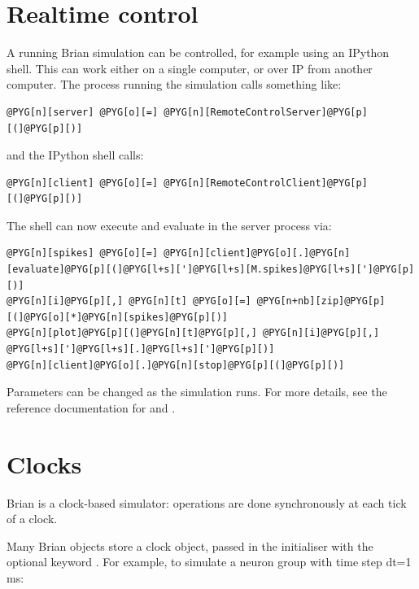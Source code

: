 \documentclass[letterpaper,10pt,english]{manual}
\begin{document}
\resetcurrentobjects
\hypertarget{--doc-realtime}{}

\section{Realtime control}

A running Brian simulation can be controlled, for example using an IPython shell.
This can work either on a single computer, or over IP from another computer.
The process running the simulation calls something like:

\begin{Verbatim}[commandchars=@\[\]]
@PYG[n][server] @PYG[o][=] @PYG[n][RemoteControlServer]@PYG[p][(]@PYG[p][)]
\end{Verbatim}

and the IPython shell calls:

\begin{Verbatim}[commandchars=@\[\]]
@PYG[n][client] @PYG[o][=] @PYG[n][RemoteControlClient]@PYG[p][(]@PYG[p][)]
\end{Verbatim}

The shell can now execute and evaluate in the server process via:

\begin{Verbatim}[commandchars=@\[\]]
@PYG[n][spikes] @PYG[o][=] @PYG[n][client]@PYG[o][.]@PYG[n][evaluate]@PYG[p][(]@PYG[l+s][']@PYG[l+s][M.spikes]@PYG[l+s][']@PYG[p][)]
@PYG[n][i]@PYG[p][,] @PYG[n][t] @PYG[o][=] @PYG[n+nb][zip]@PYG[p][(]@PYG[o][*]@PYG[n][spikes]@PYG[p][)]
@PYG[n][plot]@PYG[p][(]@PYG[n][t]@PYG[p][,] @PYG[n][i]@PYG[p][,] @PYG[l+s][']@PYG[l+s][.]@PYG[l+s][']@PYG[p][)]
@PYG[n][client]@PYG[o][.]@PYG[n][stop]@PYG[p][(]@PYG[p][)]
\end{Verbatim}

Parameters can be changed as the simulation runs. For more details, see the
reference documentation for \hyperlink{brian.RemoteControlServer}{} and
\hyperlink{brian.RemoteControlClient}{}.

\resetcurrentobjects
\hypertarget{--doc-clocks}{}

\hypertarget{index-2}{}\section{Clocks}

Brian is a clock-based simulator: operations are done synchronously at each tick of a clock.

Many Brian objects store a clock object, passed in the initialiser with the optional keyword .
For example, to simulate a neuron group with time step dt=1 ms:
\end{document}
